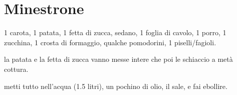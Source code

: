 \section{Minestrone}

\generalRecipeInfos{}

1 carota, 1 patata, 1 fetta di zucca, sedano, 1 foglia di cavolo, 1 porro, 1 zucchina, 1 crosta di formaggio, qualche pomodorini, 1 piselli/fagioli.

la patata e la fetta di zucca vanno messe intere che poi le schiaccio a metà cottura.

metti tutto nell'acqua (1.5 litri), un pochino di olio, il sale, e fai ebollire.
